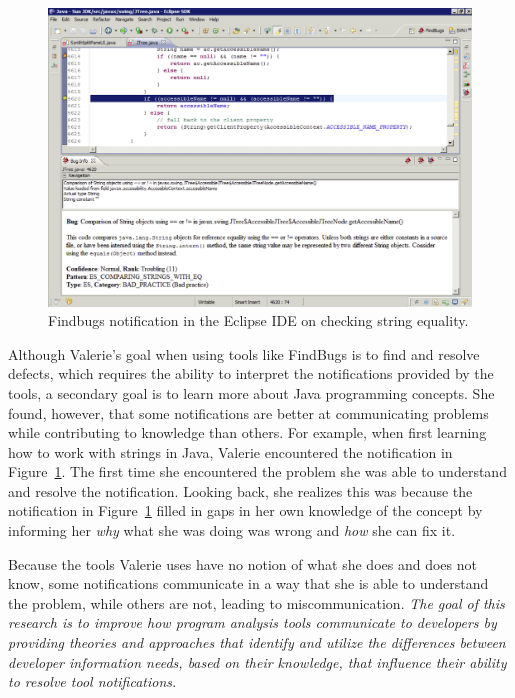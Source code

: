 
\begin{figure} 
	\centering
	\includegraphics[width=\textwidth]{Chapter-2/figs/eclipse-2.png}
	\caption{Findbugs notification in the Eclipse IDE on checking string equality.}
	\label{fig:eclipse2}
\end{figure}

Although Valerie's goal when using tools like FindBugs is to find and resolve defects, which requires the ability to interpret the notifications provided by the tools, a secondary goal is to learn more about Java programming concepts. She found, however, that some notifications are better at communicating problems while contributing to knowledge than others. For example, when first learning how to work with strings in Java, Valerie encountered the notification in Figure~\ref{fig:eclipse2}. The first time she encountered the problem she was able to understand and resolve the notification. Looking back, she realizes this was because the notification in Figure~\ref{fig:eclipse2} filled in gaps in her own knowledge of the concept by informing her \emph{why} what she was doing was wrong and \emph{how} she can fix it.

Because the tools Valerie uses have no notion of what she does and does not know, some notifications communicate in a way that she is able to understand the problem, while others are not, leading to  miscommunication.
\textit{The goal of this research is to improve how program analysis tools communicate to developers by providing theories and approaches that identify and utilize the differences between developer information needs, based on their knowledge, that influence their ability to resolve tool notifications.}

